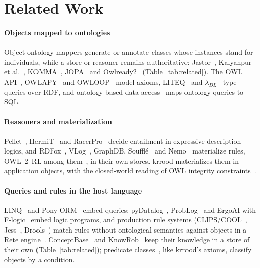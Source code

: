 \documentclass[sigconf,anonymous]{aamas}
\begin{document}
\section{Related Work}
\label{sec:related-work}

\paragraph{Objects mapped to ontologies}
Object-ontology mappers generate or annotate classes whose instances stand for individuals, while a store or reasoner remains authoritative: Jastor~\cite{szekely2009jastor}, Kalyanpur et al.~\cite{kalyanpur2004automatic}, KOMMA~\cite{wenzel2010komma}, JOPA~\cite{ledvinka2016jopa} and Owlready2~\cite{lamy2017owlready} (Table~\ref{tab:related}). The OWL API~\cite{horridge2011owl}, OWLAPY~\cite{baci2025owlapy} and OWLOOP~\cite{buoncompagni2024owloop} model axioms, LITEQ~\cite{leinberger2014liteq} and $\lambda_{DL}$~\cite{leinberger2017essence} type queries over RDF, and ontology-based data access~\cite{poggi2008linking,calvanese2017ontop,calvanese2011mastro} maps ontology queries to SQL.

\paragraph{Reasoners and materialization}
Pellet~\cite{sirin2007pellet}, HermiT~\cite{glimm2014hermit} and RacerPro~\cite{haarslev2012racerpro} decide entailment in expressive description logics, and RDFox~\cite{nenov2015rdfox}, VLog~\cite{carral2019vlog}, GraphDB, Soufflé~\cite{jordan2016souffle} and Nemo~\cite{ivliev2024nemo} materialize rules, OWL~2~RL among them~\cite{grosof2003description}, in their own stores. \ac{krrood} materializes them in application objects, with the closed-world reading of OWL integrity constraints~\cite{motik2009bridging,tao2010integrity}.

\paragraph{Queries and rules in the host language}
LINQ~\cite{meijer2006linq} and Pony ORM~\cite{ponyorm} embed queries; pyDatalog~\cite{carbonnelle2020pydatalog}, ProbLog~\cite{dries2015problog2} and ErgoAI with F-logic~\cite{kifer2018ergoai,kifer1995flogic} embed logic programs, and production rule systems (CLIPS/COOL~\cite{giarratano2005expert}, Jess~\cite{friedmanhill2003jess}, Drools~\cite{proctor2012drools}) match rules without ontological semantics against objects in a Rete engine~\cite{forgy1982rete}. ConceptBase~\cite{jarke1995conceptbase} and KnowRob~\cite{Tenorth2013,beetz2018know} keep their knowledge in a store of their own (Table~\ref{tab:related}); predicate classes~\cite{chambers1993predicate}, like \ac{krrood}'s axioms, classify objects by a condition.
\end{document}
